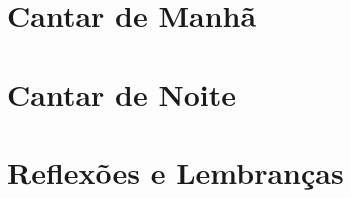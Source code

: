 \part{Cantar de Manhã}



\cleartorecto
\part{Cantar de Noite}

%

\cleartorecto
\part{Reflexões e Lembranças}

\setlength{\parskip}{10pt}



